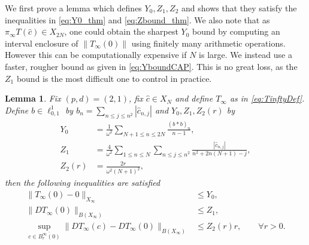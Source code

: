\documentclass{article}
\newtheorem{lemma}[theorem]{Lemma}
\newcommand{\cTrunc}{\hat{c}}
\begin{document}
We first prove a lemma which defines $Y_0,Z_1,Z_2$ and shows that they satisfy the inequalities in \eqref{eq:Y0_thm} and \eqref{eq:Zbound_thm}.
We also note that as $\pi_\infty T( \cTrunc )    \in X_{2N}$, one could obtain  the sharpest $Y_0$ bound by computing an interval enclosure of $\|T_\infty(0) \| $ using finitely many arithmetic operations. 
However  this can be computationally expensive if $N$ is large.  
We instead use a faster, rougher bound as given in \eqref{eq:YboundCAP}.  
This is no great loss, as the $Z_1$ bound is the most difficult one to control in practice. 

\begin{lemma} \label{prop:RadiiPolynomial_CAP} 
	Fix $(p,d)=(2,1)$, fix   $ \cTrunc \in X_N$ and define $ T_\infty$ as in \eqref{eq:TinftyDef}. 
	Define $b \in \ell^1_{0,1} $ by $	b_{n} = \sum_{n \leq j \leq n^2} |\hat{c}_{n,j}| $ and
	 $Y_0,Z_1,Z_2(r)$ by
	\begin{align} \label{eq:YboundCAP}
		Y_0 &= \frac{1}{\omega^2}
		\sum_{N+1 \leq n \leq 2 N } \frac{(b * b)_n}{n-1}, 
		\\
		Z_1 &= \frac{4}{\omega^2}
		\sum_{1\leq n \leq N } 
		\sum_{n\leq j \leq n^2}  \frac{|\cTrunc_{n,j}|}{n^2 +2 n (N+1)  - j} ,
				\label{eq:Z1bound}
				 \\
		Z_2(r) &=  	\frac{2 r}{\omega^2(N+1)^2} ,
		\label{eq:Z2bound}
	\end{align}
	then the following inequalities are satisfied
	\begin{align*}
	\|T_\infty(0) - 0 \|_{X_\infty} &\leq Y_0 ,
	\\
\| DT_\infty(0)\|_{B(X_\infty)}  &\leq Z_1 , \\
	\sup_{c \in \overline{B_r^\infty( 0)}} \| DT_\infty(c) - DT_\infty(0) \|_{B(X_\infty)}  &\leq Z_2(r) r  ,  \qquad \forall r >0.
	\end{align*}  

\end{lemma}
\end{document}
